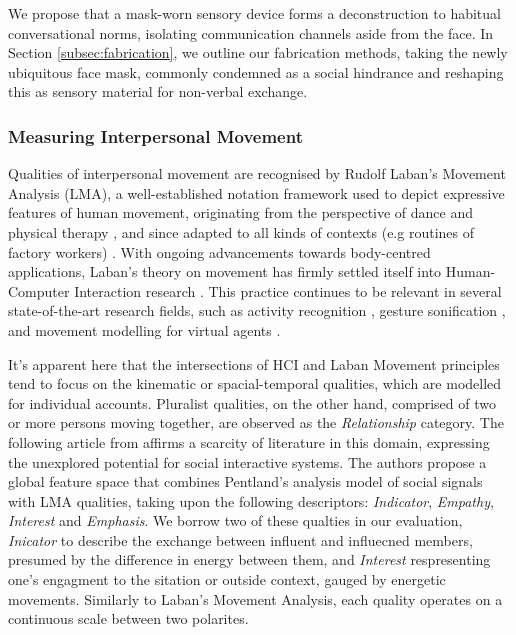 We propose that a mask-worn sensory device forms a deconstruction to habitual conversational norms, isolating communication channels aside from the face. In Section \ref{subsec:fabrication}, we outline our fabrication methods, taking the newly ubiquitous face mask, commonly condemned as a social hindrance and reshaping this as sensory material for non-verbal exchange.
 
\subsubsection{Measuring Interpersonal Movement}
\label{sec2_measuring}

Qualities of interpersonal movement are recognised by Rudolf Laban's Movement Analysis (LMA), a well-established notation framework used to depict expressive features of human movement, originating from the perspective of dance and physical therapy \citep{laban_mastery_1988}, and since adapted to all kinds of contexts (e.g routines of factory workers) \citep{davies_beyond_2006}. With ongoing advancements towards body-centred applications, Laban's theory on movement has firmly settled itself into Human-Computer Interaction research \citep{ziegelmaier_laban_2020}. This practice continues to be relevant in several state-of-the-art research fields, such as activity recognition \citep{ajili_robust_2017,truong_laban_2017}, gesture sonification \citep{fdili_alaoui_seeing_2017}, and movement modelling for virtual agents \citep{durupinar_perform_2017, ajili_robust_2017}. 

It's apparent here that the intersections of HCI and Laban Movement principles tend to focus on the kinematic or spacial-temporal qualities, which are modelled for individual accounts. Pluralist qualities, on the other hand, comprised of two or more persons moving together, are observed as the \textit{Relationship} category. The following article from \citep{roudposhti_parameterizing_2012} affirms a scarcity of literature in this domain, expressing the unexplored potential for social interactive systems. The authors propose a global feature space that combines Pentland's analysis model of social signals \citep{pentland_honest_2010} with LMA qualities, taking upon the following descriptors: \textit{Indicator}, \textit{Empathy}, \textit{Interest} and \textit{Emphasis}. We borrow two of these qualties in our evaluation, \textit{Inicator} to describe the exchange between influent and influecned members, presumed by the difference in energy between them, and \textit{Interest} respresenting one's engagment to the sitation or outside context, gauged by energetic movements. Similarly to Laban's Movement Analysis, each quality operates on a continuous scale between two polarites.

